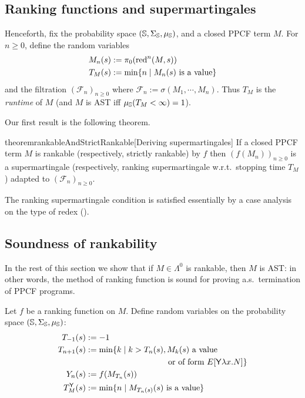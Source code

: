 \subsection{Ranking functions and supermartingales}

Henceforth, fix the probability space $({\mathbb{S}}, \Sigma_{\mathbb{S}}, \mu_{{\mathbb{S}}})$, and a closed PPCF term $M$.
For $n \geq 0$, define the random variables 
\begin{align*}
M_n(s) &:= \pi_0 (\operatorname{red}^n(M, s))\\
T_M(s) &:= \min \{n \mid \hbox{$M_n(s)$ is a value}\}
\end{align*} 
and the filtration $(\mathcal{F}_n)_{n \geq 0}$ where $\mathcal{F}_n := \sigma(M_1, \cdots, M_n)$.
Thus $T_M$ is the \emph{runtime} of $M$ (and $M$ is AST iff $\mu_{{\mathbb{S}}}(T_M < \infty) = 1$).

Our first result is the following theorem.
\begin{restatable}{theorem}{rankableAndStrictRankable}[Deriving supermartingales] 
\label{thm:rankable and strict rankable}
If a closed PPCF term $M$ is rankable (respectively, strictly rankable) by $f$ 
then $(f(M_n))_{n \geq 0}$ is a supermartingale (respectively, ranking supermartingale w.r.t.~stopping time $T_M$) adapted to $(\mathcal{F}_n)_{n \geq 0}$. %
\end{restatable}

The ranking supermartingale condition is satisfied essentially by a case analysis on the type of redex ().

\subsection{Soundness of rankability}

In the rest of this section we show that if $M \in \Lambda^0$ is rankable, then $M$ is AST: in other words, the method of ranking function is sound for proving a.s.~termination of PPCF programs.

Let $f$ be a ranking function on $M$.
Define random variables on the probability space $({\mathbb{S}}, \Sigma_{\mathbb{S}}, \mu_{{\mathbb{S}}})$:
\begin{align}
T_{-1}(s) & := -1 \nonumber \\
T_{n+1}(s) & := \min \{ k \mid k>T_n(s), M_k(s) \textrm{ a value} \nonumber\\
& \qquad\qquad\qquad\qquad\qquad \hbox{or of form } E[\tY \lambda x. N] \} \nonumber \\
Y_n(s) & := f(M_{T_n}(s)) \nonumber \\
T_M^\tY(s) &:= \min \set{n \mid M_{T_n(s)}(s) \textrm{ is a value}} \label{eq:y stopping time} 
\end{align}

